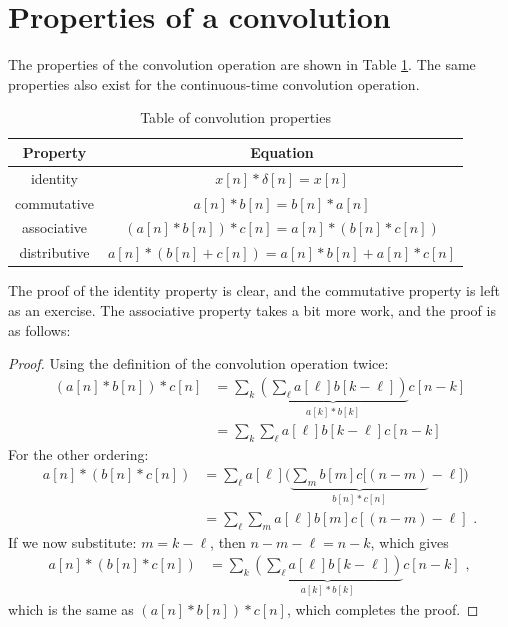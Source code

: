 \section{Properties of a convolution}
The properties of the convolution operation are shown in Table \ref{con:table}. The same properties also exist for the continuous-time convolution
operation. 
\begin{table}
    \centering
    \caption{Table of convolution properties}
    \label{con:table}
    \begin{tabular}{|c|c|}
    \hline
    Property     & Equation \\ \hline
    identity     & $x[n]*\delta[n]=x[n]$ \\ \hline
    commutative  & $a[n] * b[n] = b[n] * a[n]$ \\ \hline
    associative  & $(a[n]*b[n]) * c[n] = a[n] * ( b[n] * c[n])$ \\ \hline
    distributive & $a[n]*(b[n]+c[n]) = a[n]*b[n] + a[n]*c[n]$ \\ \hline
    \end{tabular}
\end{table}

The proof of the identity property is clear, and the commutative property is left as an exercise. The associative property takes a bit more work, and the proof is as follows: 
\begin{proof}
Using the definition of the convolution operation twice:
\begin{align}
(a[n]*b[n])*c[n] &= \sum_{k}\underbrace{\left(\sum_\ell a[\ell]b[k-\ell]\right)}_{a[k]*b[k]} c[n-k] \\
                 &= \sum_{k}\sum_\ell a[\ell]b[k-\ell]c[n-k]
\end{align}
For the other ordering:
\begin{align}
a[n]*(b[n]*c[n]) &= \sum_{\ell} a[\ell] \Big(\underbrace{\sum_m b[m]c[(n-m)}_{b[n]*c[n]}-\ell]\Big)\\
                 &= \sum_{\ell} \sum_m a[\ell] b[m]c[(n-m)-\ell]\,\,.
\end{align}
If we now substitute: $m=k-\ell$, then $n-m-\ell=n-k$, which gives
\begin{align}
a[n]*(b[n]*c[n]) &= \sum_{k} \underbrace{\left(\sum_{\ell} a[\ell] b[k-\ell]\right)}_{a[k]*b[k]} c[n-k]\,\,,
\end{align}
which is the same as $(a[n]*b[n])*c[n]$, which completes the proof.
\end{proof}

